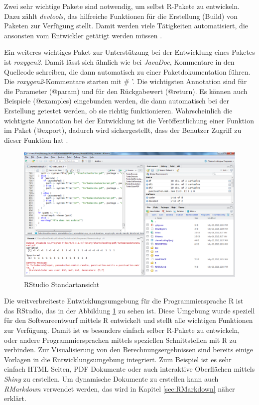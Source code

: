 Zwei sehr wichtige Pakete sind notwendig, um selbst R-Pakete zu entwickeln. Dazu zählt \emph{devtools}, das hilfreiche Funktionen für die Erstellung (Build) von Paketen zur Verfügung stellt. Damit werden viele Tätigkeiten automatisiert, die ansonsten vom Entwickler getätigt werden müssen \cite{devtools}.

Ein weiteres wichtiges Paket zur Unterstützung bei der Entwicklung eines Paketes ist \emph{roxygen2}. Damit lässt sich ähnlich wie bei \emph{JavaDoc}, Kommentare in den Quellcode schreiben, die dann automatisch zu einer Paketdokumentation führen. Die \emph{roxygen2}-Kommentare starten mit \# '. Die wichtigsten Annotation sind für die Parameter (@param) und für den Rückgabewert (@return). Es können auch Beispiele (@examples) eingebunden werden, die dann automatisch bei der Erstellung getestet werden, ob sie richtig funktionieren. Wahrscheinlich die wichtigste Annotation bei der Entwicklung ist die Veröffentlichung einer Funktion im Paket (@export), dadurch wird sichergestellt, dass der Benutzer Zugriff zu dieser Funktion hat \cite{roxygen}.

\begin{figure}[t]
\centering
\includegraphics[width=\ScaleIfNeeded]{pictures/RStudio}
\caption{RStudio Standartansicht}
\label{pic:RStudio}
\end{figure}

Die weitverbreiteste Entwicklungsumgebung für die Programmiersprache R ist das RStudio, das in der Abbildung \ref{pic:RStudio} zu sehen ist. Diese Umgebung wurde speziell für den Softwareentwurf mittels R entwickelt und stellt alle wichtigen Funktionen zur Verfügung. Damit ist es besonders einfach selber R-Pakete zu entwickeln, oder andere Programmiersprachen mittels speziellen Schnittstellen mit R zu verbinden. Zur Visualisierung von den Berechnungsergebnissen sind bereits einige Vorlagen in die Entwicklungsumgebung integriert. Zum Beispiel ist es sehr einfach HTML Seiten, PDF Dokumente oder auch interaktive Oberflächen mittels \emph{Shiny} zu erstellen. Um dynamische Dokumente zu erstellen kann auch \emph{RMarkdown} verwendet werden, das wird in Kapitel \ref{sec:RMarkdown} näher erklärt.

